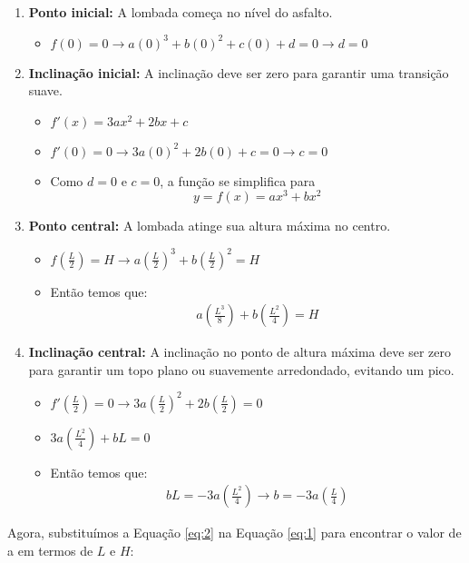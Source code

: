 \documentclass[../resumo.tex]{subfiles}
\begin{document}
	\begin{enumerate}
		\item \textbf{Ponto inicial:} A lombada começa no nível do asfalto.
			\begin{itemize}
				\item $f(0)=0 \rightarrow a(0)^3+b(0)^2 + c(0) + d = 0 \rightarrow d = 0$
			\end{itemize}
		\item \textbf{Inclinação inicial:} A inclinação deve ser zero para garantir uma transição suave.
			\begin{itemize}
				\item $f'(x) = 3ax^2 + 2bx + c$
				\item $f'(0) = 0 \rightarrow 3a(0)^2 + 2b(0) + c = 0 \rightarrow c = 0$
				\item Como $d = 0$ e $c = 0$, a função se simplifica para
					\[ y = f(x) = ax^3 + bx^2 \]
			\end{itemize}
		\item \textbf{Ponto central:} A lombada atinge sua altura máxima no centro.
			\begin{itemize}
				\item $f(\frac{L}{2}) = H \rightarrow a(\frac{L}{2})^3 + b(\frac{L}{2})^2 = H$
				\item Então temos que:
					\begin{align} \label{eq:1}
						a(\frac{L^3}{8}) + b(\frac{L^2}{4}) = H
					\end{align}
			\end{itemize}
		\item \textbf{Inclinação central:} A inclinação no ponto de altura máxima deve ser zero para
				garantir um topo plano ou suavemente arredondado, evitando um pico.
			\begin{itemize}
				\item $f'(\frac{L}{2}) = 0 \rightarrow 3a(\frac{L}{2})^2 + 2b(\frac{L}{2}) = 0$
				\item $3a(\frac{L^2}{4}) + bL = 0$
				\item Então temos que:
					\begin{align} \label{eq:2}
						bL = -3a(\frac{L^2}{4}) \rightarrow b = -3a(\frac{L}{4})
					\end{align}
			\end{itemize}
	\end{enumerate}

	Agora, substituímos a Equação \ref{eq:2} na Equação \ref{eq:1} para encontrar o valor de a em termos de $L$ e $H$:
\end{document}
